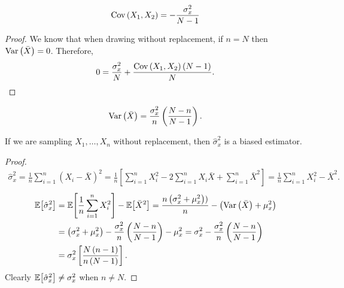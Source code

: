 \begin{cor}
    \begin{align*}
        \operatorname{Cov}\left(X_1, X_2\right) = -\frac{\sigma_x^2}{N-1}
    \end{align*}
\end{cor}

\begin{proof}
    We know that when drawing without replacement, if $n = N$ then $\operatorname{Var}\left(\bar{X}\right) = 0$. Therefore,
    \begin{align*}
        0 = \frac{\sigma_x^2}{N} + \frac{\operatorname{Cov}\left(X_1, X_2\right)\left(N-1\right)}{N}.
    \end{align*}
\end{proof}

\begin{cor}
    \begin{align*}
        \operatorname{Var}\left(\bar{X}\right) = \frac{\sigma_x^2}{n}\left(\frac{N-n}{N-1}\right).
    \end{align*}
\end{cor}

\begin{prop}
    If we are sampling $X_1, \ldots, X_n$ without replacement, then $\hat{\sigma}_x^2$ is a biased estimator.
\end{prop}

\begin{proof}
    \begin{align*}
        \hat{\sigma}_x^2 = \frac{1}{n}\sum_{i=1}^{n}\left(X_i - \bar{X}\right)^{2} = \frac{1}{n}\left[\sum_{i=1}^{n}X_i^2 - 2\sum_{i=1}^{n}X_i\bar{X} + \sum_{i=1}^{n}\bar{X}^{2}\right] = \frac{1}{n}\sum_{i=1}^{n}X_i^2 - \bar{X}^2.
    \end{align*}
    \begin{align*}
        \operatorname{\mathbb{E}}\!\left[{\hat{\sigma}_x^2}\right] &= \operatorname{\mathbb{E}}\!\left[{\frac{1}{n}\sum_{i=1}^{n}X_i^2}\right] - \operatorname{\mathbb{E}}\!\left[{\bar{X}^2}\right] = \frac{n\left(\sigma_x^2 + \mu_x^2\right))}{n} - \left(\operatorname{Var}\left(\bar{X}\right) + \mu_x^2\right) \\
        &= \left(\sigma_x^2 + \mu_x^2\right) - \frac{\sigma_x^2}{n}\left(\frac{N-n}{N-1}\right) - \mu_x^2 = \sigma_x^2 - \frac{\sigma_x^2}{n}\left(\frac{N-n}{N-1}\right) \\
        &= \sigma_x^2\left[\frac{N\left(n-1\right)}{n\left(N-1\right)}\right].
    \end{align*}
    Clearly $\operatorname{\mathbb{E}}\!\left[{\hat{\sigma}_x^2}\right] \neq \sigma_x^2$ when $n \neq N$.
\end{proof}
